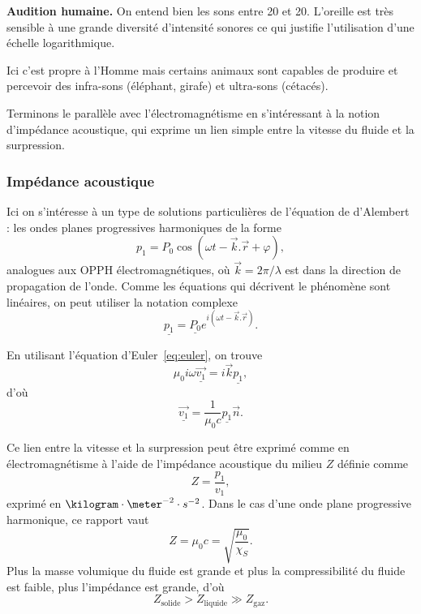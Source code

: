 \begin{slide}
\textbf{Audition humaine.}
On entend bien les sons entre \unit{20}{\hertz} et \unit{20}{\kilo\hertz}.
L'oreille est très sensible à une grande diversité d'intensité sonores ce qui justifie l'utilisation d'une échelle logarithmique.

Ici c'est propre à l'Homme mais certains animaux sont capables de produire et percevoir des infra-sons (éléphant, girafe) et ultra-sons (cétacés).
\end{slide}

\begin{transition}
Terminons le parallèle avec l'électromagnétisme en s'intéressant à la notion d'impédance acoustique, qui exprime un lien simple entre la vitesse du fluide et la surpression.
\end{transition}

\subsubsection{Impédance acoustique}

Ici on s'intéresse à un type de solutions particulières de l'équation de d'Alembert : les ondes planes progressives harmoniques de la forme
\begin{equation*}
p_1 = P_0 \cos \left( \omega t - \overrightarrow{k}.\overrightarrow{r} + \varphi \right),
\end{equation*}
analogues aux OPPH électromagnétiques, où $\overrightarrow{k}=2\pi/\lambda$ est dans la direction de propagation de l'onde.
Comme les équations qui décrivent le phénomène sont linéaires, on peut utiliser la notation complexe
\begin{equation}
\underline{p_1} = \underline{P_0} e^{i\left(\omega t - \overrightarrow{k}.\overrightarrow{r}\right)}.
\end{equation}

En utilisant l'équation d'Euler~\ref{eq:euler}, on trouve
\begin{equation*}
\mu_0 i\omega \underline{\overrightarrow{v_1}} = i\overrightarrow{k}\underline{p_1},
\end{equation*}
d'où
\begin{equation}
\underline{\overrightarrow{v_1}} = \frac{1}{\mu_0 c} \underline{p_1} \overrightarrow{n}.
\end{equation}

Ce lien entre la vitesse et la surpression peut être exprimé comme en électromagnétisme à l'aide de l'impédance acoustique du milieu $Z$ définie comme
\begin{equation}
Z = \frac{p_1}{v_1},
\end{equation}
exprimé en $\kilogram \cdot \meter^{-2} \cdot s^{-2}$.
Dans le cas d'une onde plane progressive harmonique, ce rapport vaut
\begin{equation}
Z = \mu_0 c = \sqrt{\frac{\mu_0}{\chi_S}}.
\end{equation}
Plus la masse volumique du fluide est grande et plus la compressibilité du fluide est faible, plus l'impédance est grande, d'où
\begin{equation*}
Z_\mathrm{solide} > Z_\mathrm{liquide} \gg Z_\mathrm{gaz}.
\end{equation*}


